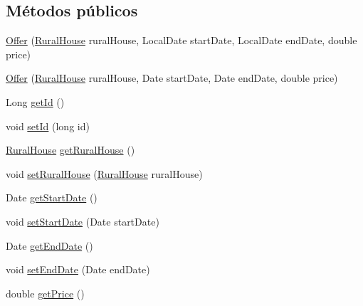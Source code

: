 \subsection*{Métodos públicos}
\begin{DoxyCompactItemize}
\item 
\mbox{\hyperlink{classcom_1_1ruralhousejsf_1_1domain_1_1_offer_ac2559262a3321b69ab5abb4ae28ade81}{Offer}} (\mbox{\hyperlink{classcom_1_1ruralhousejsf_1_1domain_1_1_rural_house}{Rural\+House}} rural\+House, Local\+Date start\+Date, Local\+Date end\+Date, double price)
\item 
\mbox{\hyperlink{classcom_1_1ruralhousejsf_1_1domain_1_1_offer_a9e313baa59c91681f9b88a91a3254b65}{Offer}} (\mbox{\hyperlink{classcom_1_1ruralhousejsf_1_1domain_1_1_rural_house}{Rural\+House}} rural\+House, Date start\+Date, Date end\+Date, double price)
\item 
Long \mbox{\hyperlink{classcom_1_1ruralhousejsf_1_1domain_1_1_offer_aebea4d12647f454b017ef7102b70fd90}{get\+Id}} ()
\item 
void \mbox{\hyperlink{classcom_1_1ruralhousejsf_1_1domain_1_1_offer_a470323b09c0c64417eb21c748d008045}{set\+Id}} (long id)
\item 
\mbox{\hyperlink{classcom_1_1ruralhousejsf_1_1domain_1_1_rural_house}{Rural\+House}} \mbox{\hyperlink{classcom_1_1ruralhousejsf_1_1domain_1_1_offer_a431afac3e582055bb908b715f2d22bdd}{get\+Rural\+House}} ()
\item 
void \mbox{\hyperlink{classcom_1_1ruralhousejsf_1_1domain_1_1_offer_ab10c2d200d23aff2383f720b1dcecd02}{set\+Rural\+House}} (\mbox{\hyperlink{classcom_1_1ruralhousejsf_1_1domain_1_1_rural_house}{Rural\+House}} rural\+House)
\item 
Date \mbox{\hyperlink{classcom_1_1ruralhousejsf_1_1domain_1_1_offer_a41039d86fd455568f6623996b639b7a5}{get\+Start\+Date}} ()
\item 
void \mbox{\hyperlink{classcom_1_1ruralhousejsf_1_1domain_1_1_offer_ad829c57ed6d018c673d4fff942757ed4}{set\+Start\+Date}} (Date start\+Date)
\item 
Date \mbox{\hyperlink{classcom_1_1ruralhousejsf_1_1domain_1_1_offer_aa6adb6e4f0999247d9426233f62b2185}{get\+End\+Date}} ()
\item 
void \mbox{\hyperlink{classcom_1_1ruralhousejsf_1_1domain_1_1_offer_a4ee5091e976e14c9b34817e1c8225e01}{set\+End\+Date}} (Date end\+Date)
\item 
double \mbox{\hyperlink{classcom_1_1ruralhousejsf_1_1domain_1_1_offer_a498e3f0617a7a097d68857ce20e6addd}{get\+Price}} ()

\end{DoxyCompactItemize}

